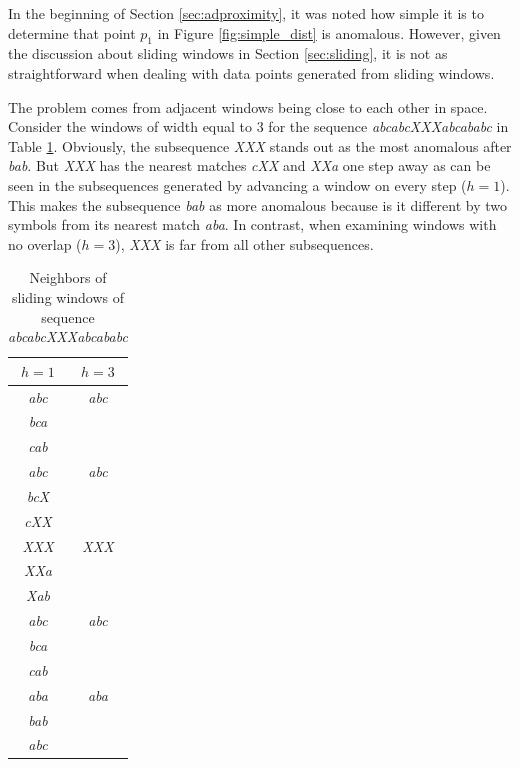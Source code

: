 In the beginning of Section \ref{sec:adproximity}, it was noted how simple it is to determine that point $p_1$ in Figure \ref{fig:simple_dist} is anomalous. However, given the discussion about sliding windows in Section \ref{sec:sliding}, it is not as straightforward when dealing with data points generated from sliding windows.

The problem comes from adjacent windows being close to each other in space. Consider the windows of width equal to 3 for the sequence \emph{abcabcXXXabcababc} \cite{Keogh2005} in Table \ref{tbl:selfmatch}. Obviously, the subsequence \emph{XXX} stands out as the most anomalous after \emph{bab}. But \emph{XXX} has the nearest matches \emph{cXX} and \emph{XXa} one step away as can be seen in the subsequences generated by advancing a window on every step ($h=1$). This makes the subsequence \emph{bab} as more anomalous because is it different by two symbols from its nearest match \emph{aba}. In contrast, when examining windows with no overlap ($h=3$), \emph{XXX} is far from all other subsequences.

\begin{table}[h]
  \centering
  \caption[Neighbors of sliding windows]{Neighbors of sliding windows of sequence \emph{abcabcXXXabcababc}}
  \begin{tabular}{|c||c|}
    \hline
    $h=1$ & $h=3$ \\
    \hline
    \hline
    \emph{abc} & \emph{abc} \\
    \emph{bca} & \\
    \emph{cab} & \\
    \hline
    \emph{abc} & \emph{abc} \\
    \emph{bcX} & \\
    \emph{cXX} & \\
    \hline
    \emph{XXX} & \emph{XXX} \\
    \emph{XXa} & \\
    \emph{Xab} & \\
    \hline
    \emph{abc} & \emph{abc} \\
    \emph{bca} & \\
    \emph{cab} & \\
    \hline
    \emph{aba} & \emph{aba} \\ 
    \emph{bab} & \\
    \emph{abc} & \\
    \hline
  \end{tabular}
  \label{tbl:selfmatch}
\end{table}

